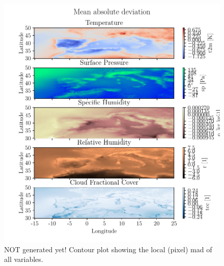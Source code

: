 \begin{figure}[ht]
    \centering
    \includegraphics{python_figs/contourplot_all_variables_mad.pdf}
    \caption{NOT generated yet! Contour plot showing the local (pixel) mad of all variables.}
    \label{fig:contour_mad_all_vars}
\end{figure}


